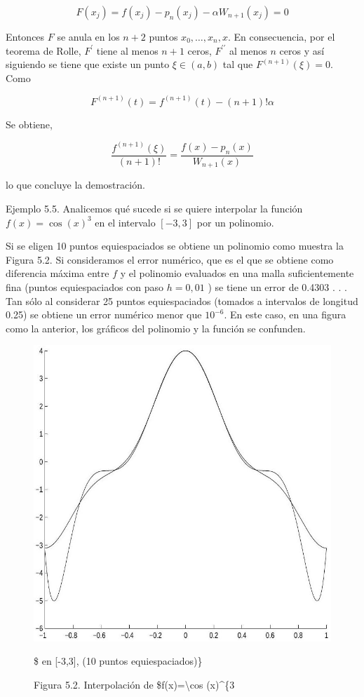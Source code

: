 \documentclass[10pt]{book}
\begin{document}
$$
F\left(x_{j}\right)=f\left(x_{j}\right)-p_{n}\left(x_{j}\right)-\alpha W_{n+1}\left(x_{j}\right)=0
$$

Entonces $F$ se anula en los $n+2$ puntos $x_{0}, \ldots, x_{n}, x$. En consecuencia, por el teorema de Rolle, $F^{\prime}$ tiene al menos $n+1$ ceros, $F^{\prime \prime}$ al menos $n$ ceros y así siguiendo se tiene que existe un punto $\xi \in(a, b)$ tal que $F^{(n+1)}(\xi)=0$. Como

$$
F^{(n+1)}(t)=f^{(n+1)}(t)-(n+1)!\alpha
$$

Se obtiene,

$$
\frac{f^{(n+1)}(\xi)}{(n+1)!}=\frac{f(x)-p_{n}(x)}{W_{n+1}(x)}
$$

lo que concluye la demostración.

Ejemplo 5.5. Analicemos qué sucede si se quiere interpolar la función $f(x)=\cos (x)^{3}$ en el intervalo $[-3,3]$ por un polinomio.

Si se eligen 10 puntos equiespaciados se obtiene un polinomio como muestra la Figura 5.2. Si consideramos el error numérico, que es el que se obtiene como diferencia máxima entre $f$ y el polinomio evaluados en una malla suficientemente fina (puntos equiespaciados con paso $h=0,01$ ) se tiene un error de 0.4303 . . . Tan sólo al considerar 25 puntos equiespaciados (tomados a intervalos de longitud 0.25) se obtiene un error numérico menor que $10^{-6}$. En este caso, en una figura como la anterior, los gráficos del polinomio y la función se confunden.

\begin{figure}[h]
\begin{center}
  \includegraphics[width=\textwidth]{2025_09_05_3888c9ac96bd653d96b4g-098}
\captionsetup{labelformat=empty}
\caption{Figura 5.2. Interpolación de \$f(x)=\textbackslash cos (x)\^{}\{3}\$ en [-3,3], (10 puntos equiespaciados)\}\end{center}
\end{figure}
\end{document}

